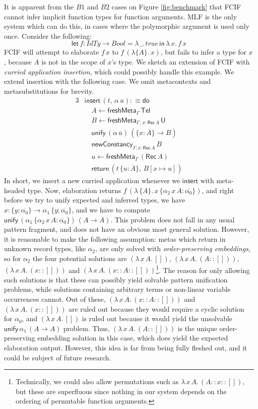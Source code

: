 \documentclass[acmsmall,review,anonymous,prologue,dvipsnames]{acmart}\settopmatter{printfolios=true,printccs=false,printacmref=false}
\newcommand{\slet}{\boldsymbol{\mathsf{let}}}
\renewcommand{\sin}{\boldsymbol{\mathsf{in}}}
\renewcommand{\U}{\mathsf{U}}
\newcommand{\unify}{\mathsf{unify}}
\newcommand{\edo}{\boldsymbol{\mathsf{do}}}
\newcommand{\ereturn}{\boldsymbol{\mathsf{return}}}
\newcommand{\einsert}{\mathsf{insert}}
\newcommand{\Tel}{\mathsf{Tel}}
\newcommand{\Rec}{\mathsf{Rec}}
\newcommand{\ol}[1]{\overline{#1}}
\theoremstyle{remark}
\begin{document}
It is apparent from the $B1$ and $B2$ cases on Figure \ref{fig:benchmark} that FCIF
cannot infer implicit function types for function arguments.  MLF is the only
system which can do this, in cases where the polymorphic argument is used only
once. Consider the following:
\[
  \slet\,f : IdTy \to Bool = \lambda\,\_.\,true\,\sin\,\lambda\,x.\,f\,x
  \]
FCIF will attempt to elaborate $f\,x$ to $f\,(\lambda\{A\}.\,x)$, but fails to
infer a type for $x$, because $A$ is not in the scope of $x$'s type. We sketch
an extension of FCIF with \emph{curried application insertion}, which could
possibly handle this example. We extend insertion with the following case. We
omit metacontexts and metasubstitutions for brevity.
\begin{alignat*}{3}
& \einsert\,(t,\,\alpha\,\ol{u}) :\equiv \edo \\
& \quad A \leftarrow \mathsf{freshMeta}_{\Gamma}\,\Tel\\
& \quad B \leftarrow \mathsf{freshMeta}_{\Gamma,\,x: \Rec\,A}\,\U\\
& \quad \unify\,(\alpha\,\ol{u})\,(\{x : \ol{A}\} \to B)\\
& \quad \mathsf{newConstancy}_{\Gamma, x : \Rec\,A}\,B\\
& \quad u \leftarrow \mathsf{freshMeta}_{\Gamma}\,(\Rec\,A)\\
& \quad \ereturn\,(t\,\{u : \ol{A}\},\,B[x \mapsto u])
\end{alignat*}
In short, we insert a new curried application whenever we $\einsert$ with
meta-headed type. Now, elaboration returns
$f\,(\lambda\,\{A\}.\,x\,\{\alpha_2\,x\,A : \ol{\alpha_0}\})$, and right before
we try to unify expected and inferred types, we have $x : \{y :
\ol{\alpha_0}\}\to \alpha_1\,\{y : \ol{\alpha_0}\}$, and we have to compute
$\unify\,(\alpha_1\,\{\alpha_2\,x\,A : \ol{\alpha_0}\})\,(A \to A)$. This
problem does not fall in any usual pattern fragment, and does not have an
obvious most general solution. However, it is reasonable to make the following
assumption: metas which return in unknown record types, like $\alpha_2$, are
only solved with \emph{order-preserving embeddings}, so for $\alpha_2$ the four
potential solutions are $(\lambda\,x\,A.\,[])$, $(\lambda\,x\,A.\,(A :: []))$,
$(\lambda\,x\,A.\,(x :: []))$ and $(\lambda\,x\,A.\,(x :: A :: []))$\footnote{Technically, we could also allow permutations such as $\lambda\,x\,A.\,(A :: x :: [])$, but these are superfluous since nothing in our system depends on the ordering of permutable function arguments.}. The reason
for only allowing such solutions is that these can possibly yield solvable
pattern unification problems, while solutions containing arbitrary terms or
non-linear variable occurrences cannot. Out of these, $(\lambda\,x\,A.\,(x :: A
:: []))$ and $(\lambda\,x\,A.\,(x :: []))$ are ruled out because they would
require a cyclic solution for $\alpha_0$, and $(\lambda\,x\,A.\,[])$ is ruled
out because it would yield the unsolvable $\unify\,\alpha_1\,(A \to A)$
problem. Thus, $(\lambda\,x\,A.\,(A :: []))$ is the unique order-preserving
embedding solution in this case, which does yield the expected elaboration
output. However, this idea is far from being fully fleshed out, and it
could be subject of future research.
\end{document}
